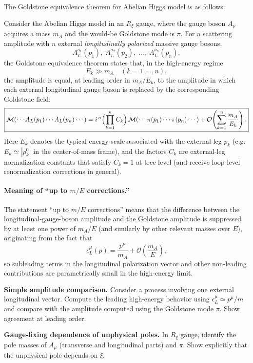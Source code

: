 \begin{solution}[24.2]
	The Goldstone equivalence theorem for Abelian Higgs model is as follows:
	
	Consider the Abelian Higgs model in an $R_\xi$ gauge, where the gauge boson $A_\mu$ acquires a mass $m_A$ and the would-be Goldstone mode is $\pi$.
	For a scattering amplitude with $n$ external \emph{longitudinally polarized} massive gauge bosons,
	\[
	A_L^{a_1}(p_1),\;A_L^{a_2}(p_2),\;\dots,\;A_L^{a_n}(p_n),
	\]
	the Goldstone equivalence theorem states that, in the high-energy regime
	\[
	E_k \gg m_A \quad (k=1,\dots,n),
	\]
	the amplitude is equal, at leading order in $m_A/E_k$, to the amplitude in which each external longitudinal gauge boson is replaced by the corresponding Goldstone field:
	\[
	\boxed{
		\mathcal{M}\!\left(\cdots A_L(p_1)\cdots A_L(p_n)\cdots\right)
		= i^{\,n}\Bigl(\prod_{k=1}^n C_k\Bigr)\,
		\mathcal{M}\!\left(\cdots \pi(p_1)\cdots \pi(p_n)\cdots\right)
		+\mathcal{O}\!\left(\sum_{k=1}^n \frac{m_A}{E_k}\right).
	}
	\]
	Here $E_k$ denotes the typical energy scale associated with the external leg $p_k$ (e.g.\ $E_k\simeq |p_k^0|$ in the center-of-mass frame), and the factors $C_k$ are external-leg normalization constants that satisfy $C_k=1$ at tree level (and receive loop-level renormalization corrections in general).
	
	\paragraph{Meaning of ``up to $m/E$ corrections.''}
	The statement ``up to $m/E$ corrections'' means that the difference between the longitudinal-gauge-boson amplitude and the Goldstone amplitude is suppressed by at least one power of $m_A/E$ (and similarly by other relevant masses over $E$), originating from the fact that
	\[
	\epsilon_L^\mu(p)=\frac{p^\mu}{m_A}+\mathcal{O}\!\left(\frac{m_A}{E}\right),
	\]
	so subleading terms in the longitudinal polarization vector and other non-leading contributions are parametrically small in the high-energy limit.
\end{solution}
\begin{problem}
    \textbf{Simple amplitude comparison.} Consider a process involving one external longitudinal vector. Compute the leading high-energy behavior using \(\epsilon_L^\mu\simeq p^\mu/m\) and compare with the amplitude computed using the Goldstone mode \(\pi\). Show agreement at leading order.
\end{problem}
\begin{problem}
    \textbf{Gauge-fixing dependence of unphysical poles.} In \(R_\xi\) gauge, identify the pole masses of \(A_\mu\) (transverse and longitudinal parts) and \(\pi\). Show explicitly that the unphysical pole depends on \(\xi\).
\end{problem}
